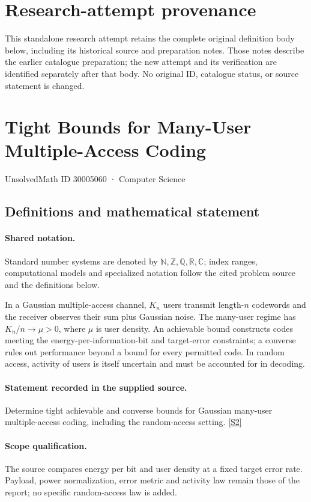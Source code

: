 \documentclass[11pt]{article}
\begin{document}
\section*{Research-attempt provenance}
This standalone research attempt retains the complete original definition body below,
including its historical source and preparation notes. Those notes describe the
earlier catalogue preparation; the new attempt and its verification are identified
separately after that body. No original ID, catalogue status, or source statement is changed.

\section{Tight Bounds for Many-User Multiple-Access Coding}\label{30005060}
{\small UnsolvedMath ID 30005060 · Computer Science}
\subsection{Definitions and mathematical statement}

\paragraph{Shared notation.}Standard number systems are denoted by $\mathbb N,\mathbb Z,\mathbb Q,\mathbb R,\mathbb C$; index ranges, computational models and specialized notation follow the cited problem source and the definitions below.


In a Gaussian multiple-access channel, $K_n$ users transmit length-$n$ codewords and the receiver observes their sum plus Gaussian noise. The many-user regime has $K_n/n\to\mu>0$, where $\mu$ is user density. An achievable bound constructs codes meeting the energy-per-information-bit and target-error constraints; a converse rules out performance beyond a bound for every permitted code. In random access, activity of users is itself uncertain and must be accounted for in decoding.
\paragraph{Statement recorded in the supplied source.}
Determine tight achievable and converse bounds for Gaussian many-user multiple-access coding, including the random-access setting. \href{https://doi.org/10.4171/owr/2022/14}{[S2]}
\paragraph{Scope qualification.}
The source compares energy per bit and user density at a fixed target error rate. Payload, power normalization, error metric and activity law remain those of the report; no specific random-access law is added.
\end{document}
